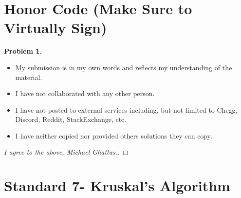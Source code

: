 \documentclass[11pt]{article}
\theoremstyle{definition}
\theoremstyle{definition}
\newtheorem{required}{Problem}
\theoremstyle{definition}
\begin{document}
\section{Honor Code (Make Sure to Virtually Sign)} \label{HonorCode}

\begin{required}
\noindent 
\begin{itemize}
\item My submission is in my own words and reflects my understanding of the material.
\item I have not collaborated with any other person.
\item I have not posted to external services including, but not limited to Chegg, Discord, Reddit, StackExchange, etc.
\item I have neither copied nor provided others solutions they can copy.
\end{itemize}

\end{required}

\begin{proof}[I agree to the above, Michael Ghattas.]
\end{proof}


\newpage
\section{Standard 7- Kruskal's Algorithm}
\end{document}
